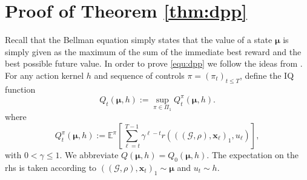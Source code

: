 \documentclass{article}
\begin{document}
\section{Proof of Theorem \ref{thm:dpp}}
\label{app:proof_dpp}
Recall that the Bellman equation simply states that the value of a state $\boldsymbol \mu$ is simply given as the maximum of the sum of the immediate best reward and the best possible future value.
In order to prove \eqref{equ:dpp} we follow the ideas from \cite{gu2023dynamic}. For any action kernel $h$ and sequence of controls $\pi = (\pi_t)_{t \le T}$, define the IQ function
$$
Q_t (\boldsymbol{\mu},h) := \sup\limits_{\pi \in \Pi_1} Q_t^\pi (\boldsymbol \mu,h).
$$
where
$$
Q_t^\pi (\boldsymbol \mu,h) := \mathbb E ^\pi \left[ \sum\limits_{\ell=t} ^{T-1} \gamma^{\ell-t} r(  ((\mathcal G,\rho), \mathbf x_\ell )_1, u_\ell ) \right],
$$
with $0 < \gamma \le 1$. We abbreviate $Q (\boldsymbol{\mu},h) = Q_0(\boldsymbol{\mu},h)$.
The expectation on the rhs is taken according to $((\mathcal G,\rho), \mathbf x_t)_1 \sim \boldsymbol \mu$ and $u_t \sim h$.
\end{document}
